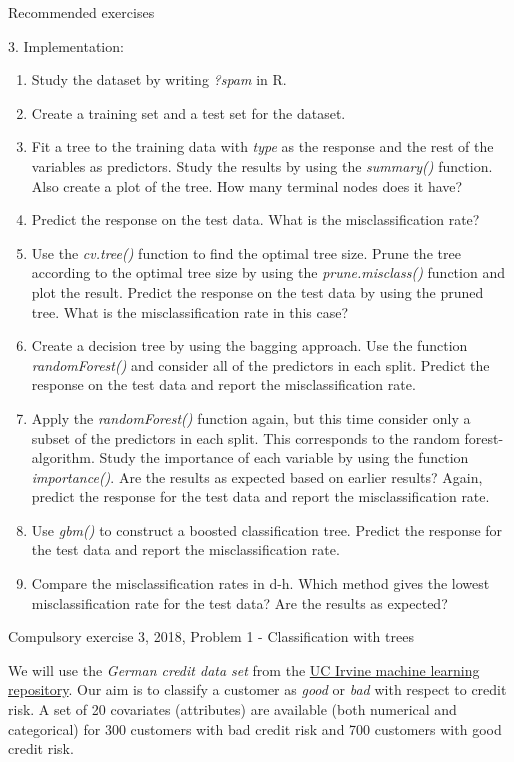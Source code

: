 \documentclass[10pt,ignorenonframetext,]{beamer}
\begin{document}
\begin{frame}[fragile]{Recommended exercises}
\begin{block}{3. Implementation:}
\begin{enumerate}
\def\labelenumi{\alph{enumi})}
\item
  Study the dataset by writing \emph{?spam} in R.
\item
  Create a training set and a test set for the dataset.
\item
  Fit a tree to the training data with \emph{type} as the response and
  the rest of the variables as predictors. Study the results by using
  the \emph{summary()} function. Also create a plot of the tree. How
  many terminal nodes does it have?
\item
  Predict the response on the test data. What is the misclassification
  rate?
\item
  Use the \emph{cv.tree()} function to find the optimal tree size. Prune
  the tree according to the optimal tree size by using the
  \emph{prune.misclass()} function and plot the result. Predict the
  response on the test data by using the pruned tree. What is the
  misclassification rate in this case?
\item
  Create a decision tree by using the bagging approach. Use the function
  \emph{randomForest()} and consider all of the predictors in each
  split. Predict the response on the test data and report the
  misclassification rate.
\item
  Apply the \emph{randomForest()} function again, but this time consider
  only a subset of the predictors in each split. This corresponds to the
  random forest-algorithm. Study the importance of each variable by
  using the function \emph{importance()}. Are the results as expected
  based on earlier results? Again, predict the response for the test
  data and report the misclassification rate.
\item
  Use \emph{gbm()} to construct a boosted classification tree. Predict
  the response for the test data and report the misclassification rate.
\item
  Compare the misclassification rates in d-h. Which method gives the
  lowest misclassification rate for the test data? Are the results as
  expected?
\end{enumerate}

\end{block}

\begin{block}{Compulsory exercise 3, 2018, Problem 1 - Classification
with trees}

We will use the \emph{German credit data set} from the
\href{https://archive.ics.uci.edu/ml/index.php}{UC Irvine machine
learning repository}. Our aim is to classify a customer as \emph{good}
or \emph{bad} with respect to credit risk. A set of 20 covariates
(attributes) are available (both numerical and categorical) for 300
customers with bad credit risk and 700 customers with good credit risk.


\end{block}
\end{frame}
\end{document}
